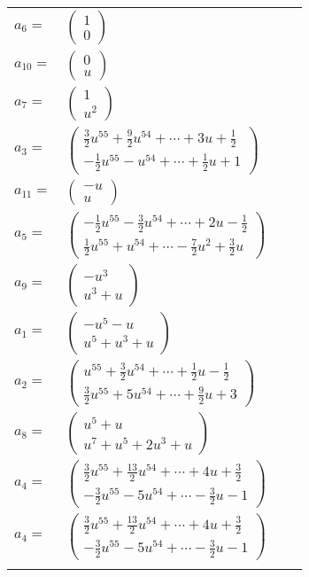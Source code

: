 \documentclass[1p]{elsarticle_modified}
\theoremstyle{definition}
\begin{document}
\begin{tabular}{m{7pt} m{180pt} m{7pt} m{180pt} }
\flushright $a_{6}=$&$\begin{pmatrix}1\\0\end{pmatrix}$ \\
\flushright $a_{10}=$&$\begin{pmatrix}0\\u\end{pmatrix}$ \\
\flushright $a_{7}=$&$\begin{pmatrix}1\\u^2\end{pmatrix}$ \\
\flushright $a_{3}=$&$\begin{pmatrix}\frac{3}{2} u^{55}+\frac{9}{2} u^{54}+\cdots+3 u+\frac{1}{2}\\-\frac{1}{2} u^{55}- u^{54}+\cdots+\frac{1}{2} u+1\end{pmatrix}$ \\
\flushright $a_{11}=$&$\begin{pmatrix}- u\\u\end{pmatrix}$ \\
\flushright $a_{5}=$&$\begin{pmatrix}-\frac{1}{2} u^{55}-\frac{3}{2} u^{54}+\cdots+2 u-\frac{1}{2}\\\frac{1}{2} u^{55}+u^{54}+\cdots-\frac{7}{2} u^2+\frac{3}{2} u\end{pmatrix}$ \\
\flushright $a_{9}=$&$\begin{pmatrix}- u^3\\u^3+u\end{pmatrix}$ \\
\flushright $a_{1}=$&$\begin{pmatrix}- u^5- u\\u^5+u^3+u\end{pmatrix}$ \\
\flushright $a_{2}=$&$\begin{pmatrix}u^{55}+\frac{3}{2} u^{54}+\cdots+\frac{1}{2} u-\frac{1}{2}\\\frac{3}{2} u^{55}+5 u^{54}+\cdots+\frac{9}{2} u+3\end{pmatrix}$ \\
\flushright $a_{8}=$&$\begin{pmatrix}u^5+u\\u^7+u^5+2 u^3+u\end{pmatrix}$ \\
\flushright $a_{4}=$&$\begin{pmatrix}\frac{3}{2} u^{55}+\frac{13}{2} u^{54}+\cdots+4 u+\frac{3}{2}\\-\frac{3}{2} u^{55}-5 u^{54}+\cdots-\frac{3}{2} u-1\end{pmatrix}$\\ \flushright $a_{4}=$&$\begin{pmatrix}\frac{3}{2} u^{55}+\frac{13}{2} u^{54}+\cdots+4 u+\frac{3}{2}\\-\frac{3}{2} u^{55}-5 u^{54}+\cdots-\frac{3}{2} u-1\end{pmatrix}$\\&\end{tabular}
\end{document}
